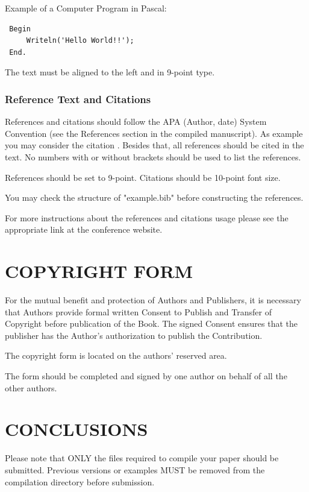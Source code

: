 \documentclass[a4paper,twoside]{article}
\begin{document}
Example of a Computer Program in Pascal:

\begin{small}
\begin{verbatim}
 Begin
     Writeln('Hello World!!');
 End.
\end{verbatim}
\end{small}


The text must be aligned to the left and in 9-point type.

\subsubsection{Reference Text and Citations}

References and citations should follow the APA (Author, date)
System Convention (see the References section in the compiled
manuscript). As example you may consider the citation
\cite{Smith98}. Besides that, all references should be cited in the
text. No numbers with or without brackets should be used to list the
references.

References should be set to 9-point. Citations should be 10-point
font size.

You may check the structure of "example.bib" before constructing the
references.

For more instructions about the references and citations usage
please see the appropriate link at the conference website.

\section{\uppercase{Copyright Form}}

For the mutual benefit and protection of Authors and
Publishers, it is necessary that Authors provide formal written
Consent to Publish and Transfer of Copyright before publication of
the Book. The signed Consent ensures that the publisher has the
Author's authorization to publish the Contribution.

The copyright form is located on the authors' reserved area.

The form should be completed and signed by one author on
behalf of all the other authors.

\section{\uppercase{Conclusions}}
\label{sec:conclusion}

Please note that ONLY the files required to compile your paper should be submitted. Previous versions or examples MUST be removed from the compilation directory before submission.
\end{document}
